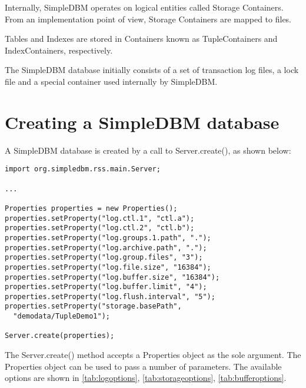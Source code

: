 \documentclass[a4paper,draft,oneside]{book}
\begin{document}
Internally, SimpleDBM operates on logical entities called Storage
Containers. From an implementation point of view, Storage Containers
are mapped to files. 

Tables and Indexes are stored in Containers known as TupleContainers
and IndexContainers, respectively.

The SimpleDBM database initially consists of a set of transaction log
files, a lock file and a special container used internally by
SimpleDBM.

\section{Creating a SimpleDBM database}

A SimpleDBM database is created by a call to Server.create(), as shown
below:

\begin{verbatim}
import org.simpledbm.rss.main.Server;

...

Properties properties = new Properties();
properties.setProperty("log.ctl.1", "ctl.a");
properties.setProperty("log.ctl.2", "ctl.b");
properties.setProperty("log.groups.1.path", ".");
properties.setProperty("log.archive.path", ".");
properties.setProperty("log.group.files", "3");
properties.setProperty("log.file.size", "16384");
properties.setProperty("log.buffer.size", "16384");
properties.setProperty("log.buffer.limit", "4");
properties.setProperty("log.flush.interval", "5");
properties.setProperty("storage.basePath", 
  "demodata/TupleDemo1");

Server.create(properties);
\end{verbatim}

The Server.create() method accepts a Properties object as
the sole argument. The Properties object can be used to pass a
number of parameters. The available options are shown in
\ref{tab:logoptions}, \ref{tab:storageoptions}, \ref{tab:bufferoptions}. 
\end{document}
